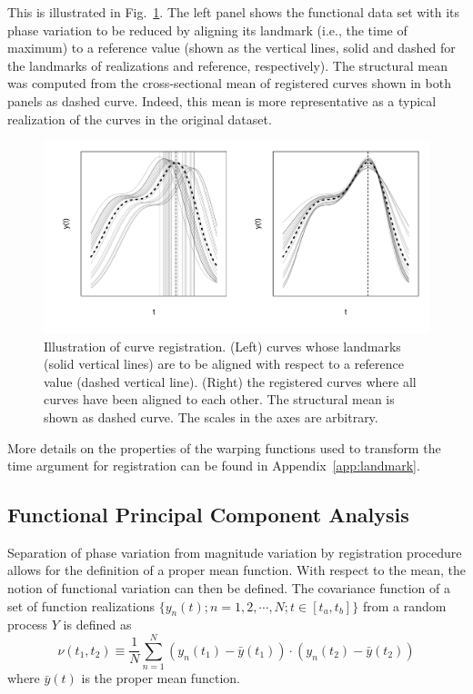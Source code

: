This is illustrated in Fig.~\ref{fig:illustrate_registered_curves}.
The left panel shows the functional data set with its phase variation to be reduced by aligning its landmark (i.e., the time of maximum) to a reference value 
(shown as the vertical lines, solid and dashed for the landmarks of realizations and reference, respectively).
The structural mean was computed from the cross-sectional mean of registered curves shown in both panels as dashed curve. 
Indeed, this mean is more representative as a typical realization of the curves in the original dataset.
\begin{figure}[bth!]
	\centering
	\includegraphics[scale=0.48,trim={0 1cm 0 0},clip]{../figures/r-figures/illustrateRegisteredCurves.png}
	\caption[Illustration of curve registration]{Illustration of curve registration. (Left) curves whose landmarks (solid vertical lines) are to be aligned with respect to a reference value (dashed vertical line). (Right) the registered curves where all curves have been aligned to each other. The structural mean is shown as dashed curve. The scales in the axes are arbitrary.}
	\label{fig:illustrate_registered_curves}
\end{figure}

More details on the properties of the warping functions used to transform the time argument for registration can be found in Appendix~\ref{app:landmark}.

\subsection{Functional Principal Component Analysis}\label{sub:sa_fpca}

Separation of phase variation from magnitude variation by registration procedure allows for the definition of a proper mean function.
With respect to the mean, the notion of functional variation can then be defined.
The covariance function of a set of function realizations $\{y_n(t);n = 1, 2, \cdots, N; t \in [t_a,t_b]\}$ from a random process $Y$ is defined as
\begin{equation}
	\nu (t_1, t_2) \equiv \frac{1}{N} \sum_{n=1}^{N} (y_n(t_1) - \bar{y}(t_1)) \cdot (y_n(t_2) - \bar{y}(t_2))
\label{eq:covariance_function}
\end{equation}
where $\bar{y} (t)$ is the proper mean function.

